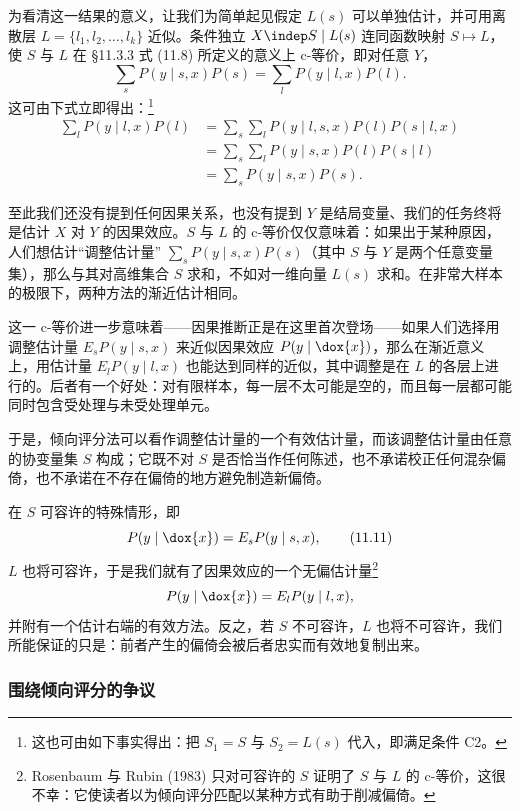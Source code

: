 为看清这一结果的意义，让我们为简单起见假定 $L(s)$ 可以单独估计，并可用离散层 $L=\{l_1,l_2,\dots,l_k\}$ 近似。条件独立 $X\indep S\mid L(s)$ 连同函数映射 $S\mapsto L$，使 $S$ 与 $L$ 在 \S 11.3.3 式 (11.8) 所定义的意义上 c-等价，即对任意 $Y$，
\begin{equation}
\sum_{s}P(y\mid s,x)P(s)=\sum_{l}P(y\mid l,x)P(l). \tag{11.10}
\end{equation}
这可由下式立即得出：\footnote{这也可由如下事实得出：把 $S_1=S$ 与 $S_2=L(s)$ 代入，即满足条件 C2。}
\[
\begin{aligned}
\sum_{l}P(y\mid l,x)P(l) &= \sum_{s}\sum_{l}P(y\mid l,s,x)P(l)P(s\mid l,x)\\
&= \sum_{s}\sum_{l}P(y\mid s,x)P(l)P(s\mid l)\\
&= \sum_{s}P(y\mid s,x)P(s).
\end{aligned}
\]

至此我们还没有提到任何因果关系，也没有提到 $Y$ 是结局变量、我们的任务终将是估计 $X$ 对 $Y$ 的因果效应。$S$ 与 $L$ 的 c-等价仅仅意味着：如果出于某种原因，人们想估计“调整估计量” $\sum_s P(y\mid s,x)P(s)$（其中 $S$ 与 $Y$ 是两个任意变量集），那么与其对高维集合 $S$ 求和，不如对一维向量 $L(s)$ 求和。在非常大样本的极限下，两种方法的渐近估计相同。

这一 c-等价进一步意味着——因果推断正是在这里首次登场——如果人们选择用调整估计量 $E_sP(y\mid s,x)$ 来近似因果效应 $P(y\mid\dox{x})$，那么在渐近意义上，用估计量 $E_lP(y\mid l,x)$ 也能达到同样的近似，其中调整是在 $L$ 的各层上进行的。后者有一个好处：对有限样本，每一层不太可能是空的，而且每一层都可能同时包含受处理与未受处理单元。

于是，倾向评分法可以看作调整估计量的一个有效估计量，而该调整估计量由任意的协变量集 $S$ 构成；它既不对 $S$ 是否恰当作任何陈述，也不承诺校正任何混杂偏倚，也不承诺在不存在偏倚的地方避免制造新偏倚。

在 $S$ 可容许的特殊情形，即
\begin{equation}
P(y\mid\dox{x})=E_sP(y\mid s,x), \tag{11.11}
\end{equation}
$L$ 也将可容许，于是我们就有了因果效应的一个无偏估计量\footnote{Rosenbaum 与 Rubin (1983) 只对可容许的 $S$ 证明了 $S$ 与 $L$ 的 c-等价，这很不幸：它使读者以为倾向评分匹配以某种方式有助于削减偏倚。}
\[
P(y\mid\dox{x})=E_lP(y\mid l,x),
\]
并附有一个估计右端的有效方法。反之，若 $S$ 不可容许，$L$ 也将不可容许，我们所能保证的只是：前者产生的偏倚会被后者忠实而有效地复制出来。

\subsubsection*{围绕倾向评分的争议}

